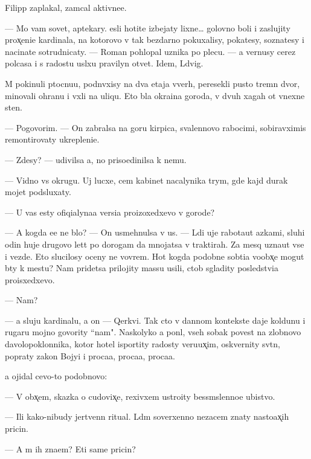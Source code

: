 \documentclass[10pt]{book}
\begin{document}
Filipp zaplakal, zam{\yi}cal aktivne{\y}e.

— Mo{\y} vam sovet, aptekary. {\Y}esli hotite izbejaty lixne{\y}… golovno{\y} boli i zaslujity prox̨eni{\y}e kardinala, na kotorovo v{\yi} tak bezdarno pokuxalisy, poka{\y}tesy, sozna{\y}tesy i nacina{\y}te sotrudnicaty. — Roman pohlopal uznika po plecu. — {\Y}a vernusy cerez polcasa i s radost{\y}u usl{\yi}xu pravilyn{\yi}{\y} otvet. Idem, L{\iu}dvig.

M{\yi} pokinuli p{\yi}tocnu{\y}u, podn{\ia}vxisy na dva etaja vverh, peresekli pusto{\y} t{\iu}remn{\yi}{\y} dvor, minovali ohranu i v{\yi}xli na uliqu. Eto b{\yi}la okra{\y}ina goroda, v dvuh xagah ot vnexne{\y} sten{\yi}.

— Pogovorim. — On zabralsa na goru kirpica, svalennovo rabocimi, sobiravximis{\ia} remontirovaty ukrepleni{\y}e.

— Zdesy? — udivilsa {\y}a, no priso{\y}edinilsa k nemu.

— Vidno vs{\iu} okrugu. Uj lucxe, cem kabinet nacalynika t{\iu}rym{\yi}, gde kajd{\yi}{\y} durak mojet podsluxaty.

— U vas {\y}esty ofiqialyna{\y}a versi{\y}a pro{\y}izoxedxevo v gorode?

— A kogda {\y}e{\y}e ne b{\yi}lo? — On usmehnulsa v us{\yi}. — L{\iu}di uje rabota{\y}ut {\y}az{\yi}kami, sluhi odin huje drugovo let{\ia}t po dorogam da mnojatsa v traktirah. Za mes{\ia}q uzna{\y}ut vse i vezde. Eto slucilosy oceny ne vovrem{\ia}. Hot{\ia} kogda podobn{\yi}{\y}e sob{\yi}ti{\y}a voobx̨e mogut b{\yi}ty k mestu? Nam pridetsa prilojity massu usili{\y}, ctob{\yi} sgladity posledstvi{\y}a pro{\y}isxedxevo.

— Nam?

— {\Y}a sluju kardinalu, a on — Qerkvi. Tak cto v dannom kontekste daje koldunu i rugaru mojno govority ``nam". Naskolyko {\y}a pon{\ia}l, vseh sobak poves{\ia}t na zlobnovo d{\y}avolopoklonnika, kotor{\yi}{\y} hotel isportity radosty veru{\y}ux̨im, oskvernity sv{\ia}t{\yi}n{\iu}, popraty zakon{\yi} Bojyi i proca{\y}a, proca{\y}a, proca{\y}a.

{\Y}a ojidal cevo-to podobnovo:

— V obx̨em, skazka o cudovix̨e, rexivxem ustro{\y}ity bessm{\yi}slenno{\y}e ubi{\y}stvo.

— Ili kako{\y}-nibudy jertvenn{\yi}{\y} ritual. L{\iu}d{\ia}m soverxenno nezacem znaty nasto{\y}ax̨ih pricin.

— A m{\yi} ih zna{\y}em? Eti sam{\yi}{\y}e pricin{\yi}?
\end{document}
